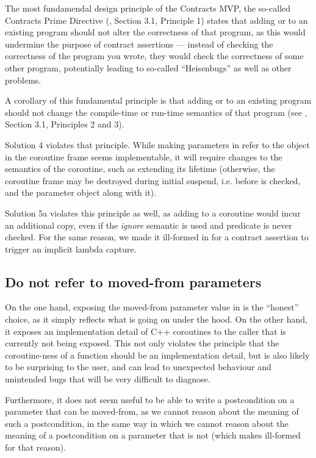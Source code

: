 The most fundamendal design principle of the Contracts MVP, the so-called Contracts Prime Directive (\cite{P2900R8}, Section 3.1, Principle 1) states that adding  or  to an existing program should not alter the correctness of that program, as this would undermine the purpose of contract assertions --- instead of checking the correctness of the program you wrote, they would check the correctness of some other program, potentially leading to so-called ``Heisenbugs'' as well as other problems.

A corollary of this fundamental principle is that adding  or  to an existing program should not change the compile-time or run-time semantics of that program (see \cite{P2900R8}, Section 3.1, Principles 2 and 3).

Solution 4 violates that principle. While making parameters in  refer to the object in the coroutine frame seems implementable, it will require changes to the semantics of the coroutine, such as extending its lifetime (otherwise, the coroutine frame may be destroyed during initial suspend, i.e. before  is checked, and the parameter object along with it).

Solution 5a violates this principle as well, as adding  to a coroutine would incur an additional copy, even if the \emph{ignore} semantic is used and predicate is never checked. For the same reason, we made it ill-formed in \cite{P2900R8} for a contract assertion to trigger an implicit lambda capture.

\subsection{Do not refer to moved-from  parameters}

On the one hand, exposing the moved-from parameter value in  is the ``honest'' choice, as it simply reflects what is going on under the hood. On the other hand, it exposes an implementation detail of C++ coroutines to the caller that is currently not being exposed. This not only violates the principle that the coroutine-ness of a function should be an implementation detail, but is also likely to be surprising to the user, and can lead to unexpected behaviour and unintended bugs that will be very difficult to diagnose.

Furthermore, it does not seem useful to be able to write a postcondition on a parameter that can be moved-from, as we cannot reason about the meaning of such a postcondition, in the same way in which we cannot reason about the meaning of a postcondition on a parameter that is not  (which \cite{P2900R8} makes ill-formed for that reason).

